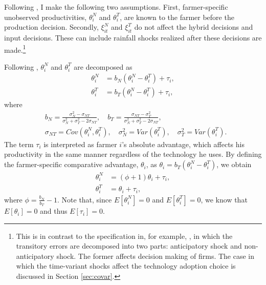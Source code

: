 \documentclass[11pt,letterpaper]{article}
\begin{document}
Following \citet{Suri11}, I make the following two assumptions.
First, farmer-specific unobserved productivities, $\theta_i^N$ and $\theta_i^T$, are known to the farmer before the production decision.
Secondly, $\xi_{it}^N$ and $\xi_{it}^T$ do not affect the hybrid decisions and input decisions.
These can include rainfall shocks realized after these decisions are made.\footnote{
  This is in contrast to the specification in, for example, \citet{OP96}, in which the transitory errors are decomposed into two parts: anticipatory shock and non-anticipatory shock.
  The former affects decision making of firms.
  The case in which the time-variant shocks affect the technology adoption choice is discussed in Section \ref{sec:covar}.
}

Following \cite{Lemieux98}, $\theta_i^N$ and $\theta_i^T$ are decomposed as 
\begin{align*}
  \theta_i^N &= b_N (\theta_i^N - \theta_i^T) + \tau_i, \\
  \theta_i^T &= b_T (\theta_i^N - \theta_i^T) + \tau_i,
\end{align*}
where
\begin{align*}
  &b_N = \frac{\sigma_N^2 - \sigma_{NT}}{\sigma_N^2 + \sigma_T^2 - 2 \sigma_{NT}},\quad b_T = \frac{\sigma_{NT} - \sigma_T^2}{\sigma_N^2 + \sigma_T^2 - 2 \sigma_{NT}}, \\
  &\sigma_{NT} = Cov(\theta_i^N, \theta_i^T),\quad \sigma_N^2 = Var(\theta_i^T),\quad \sigma_T^2 = Var(\theta_i^T).
\end{align*}
The term $\tau_i$ is interpreted as farmer $i$'s absolute advantage, which affects his productivity in the same manner regardless of the technology he uses.
By defining the farmer-specific comparative advantage, $\theta_i$, as $\theta_i = b_T (\theta_i^N - \theta_i^T)$, we obtain
\begin{align*}
  \theta_i^N &= (\phi + 1) \theta_i + \tau_i, \\
  \theta_i^T &= \theta_i + \tau_i,
\end{align*}
where $\phi = \frac{b_N}{b_T} - 1$.
Note that, since $E[\theta_i^N] = 0$ and $E[\theta_i^T] = 0$, we know that $E[\theta_i] = 0$ and thus $E[\tau_i] = 0$.
\end{document}
